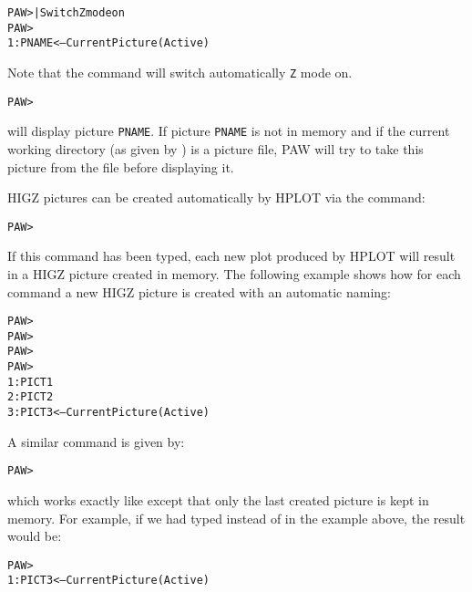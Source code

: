 \begin{alltt}
PAW >                      | Switch Z mode on
PAW > 
 1: PNAME <-- Current Picture (Active)
\end{alltt}

Note that the command  will switch automatically
\texttt{Z} mode on.

\begin{alltt}
PAW > 
\end{alltt}

will display picture \texttt{PNAME}. 
If picture \texttt{PNAME} is not in memory and if
the current working directory (as given by ) is a picture file, 
PAW will try to take this picture from the file before displaying it.

HIGZ pictures can be created automatically by HPLOT via the command:

\begin{alltt}
PAW > 
\end{alltt}

\newpage

If this command has been typed, each new plot produced by HPLOT will result in a
HIGZ picture created in memory. 
The following example shows how for each
 command a new HIGZ picture 
is created with an automatic naming:

\begin{alltt}
PAW > 
PAW > 
PAW > 
PAW > 
 1: PICT1
 2: PICT2
 3: PICT3 <-- Current Picture (Active)
\end{alltt}

A similar command is given by:

\begin{alltt}
PAW > 
\end{alltt}

which works exactly like  
except that only the last created picture is kept in memory. 
For example, if we had typed 
instead of  in the example above, 
the result would be:

\begin{alltt}
PAW > 
 1: PICT3 <-- Current Picture (Active)
\end{alltt}


